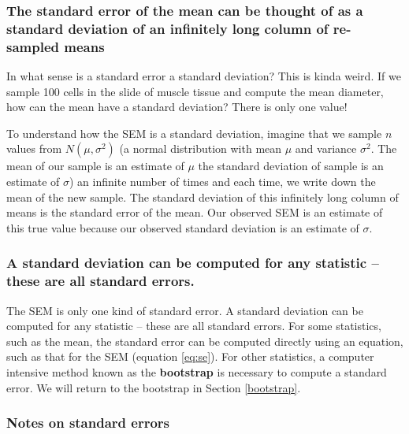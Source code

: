 \documentclass[]{book}
\begin{document}
\hypertarget{the-standard-error-of-the-mean-can-be-thought-of-as-a-standard-deviation-of-an-infinitely-long-column-of-re-sampled-means}{%
\subsubsection{The standard error of the mean can be thought of as a standard deviation of an infinitely long column of re-sampled means}\label{the-standard-error-of-the-mean-can-be-thought-of-as-a-standard-deviation-of-an-infinitely-long-column-of-re-sampled-means}}

In what sense is a standard error a standard deviation? This is kinda weird. If we sample 100 cells in the slide of muscle tissue and compute the mean diameter, how can the mean have a standard deviation? There is only one value!

To understand how the SEM is a standard deviation, imagine that we sample \(n\) values from \(N(\mu, \sigma^2)\) (a normal distribution with mean \(\mu\) and variance \(\sigma^2\). The mean of our sample is an estimate of \(\mu\) the standard deviation of sample is an estimate of \(\sigma\)) an infinite number of times and each time, we write down the mean of the new sample. The standard deviation of this infinitely long column of means is the standard error of the mean. Our observed SEM is an estimate of this true value because our observed standard deviation is an estimate of \(\sigma\).

\hypertarget{a-standard-deviation-can-be-computed-for-any-statistic-these-are-all-standard-errors.}{%
\subsubsection{A standard deviation can be computed for any statistic -- these are all standard errors.}\label{a-standard-deviation-can-be-computed-for-any-statistic-these-are-all-standard-errors.}}

The SEM is only one kind of standard error. A standard deviation can be computed for any statistic -- these are all standard errors. For some statistics, such as the mean, the standard error can be computed directly using an equation, such as that for the SEM (equation \eqref{eq:se}). For other statistics, a computer intensive method known as the \textbf{bootstrap} is necessary to compute a standard error. We will return to the bootstrap in Section \ref{bootstrap}.

\hypertarget{notes-on-standard-errors}{%
\subsubsection{Notes on standard errors}\label{notes-on-standard-errors}}
\end{document}
